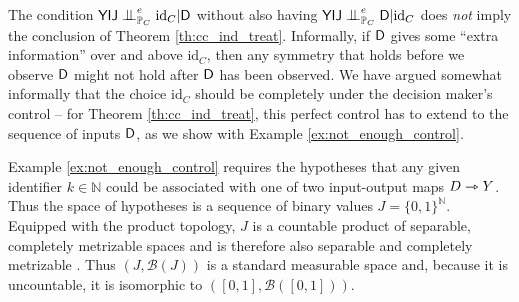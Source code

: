 


The condition $\RV{YIJ}\CI^e_{\prob{P}_C} \text{id}_C|\RV{D}$ without also having $\RV{YIJ}\CI^e_{\prob{P}_C} \RV{D}|\text{id}_C$ does \emph{not} imply the conclusion of Theorem \ref{th:cc_ind_treat}. Informally, if $\mathsf{D}$ gives some ``extra information'' over and above $\text{id}_C$, then any symmetry that holds before we observe $\mathsf{D}$ might not hold after $\mathsf{D}$ has been observed. We have argued somewhat informally that the choice $\text{id}_C$ should be completely under the decision maker's control -- for Theorem \ref{th:cc_ind_treat}, this perfect control has to extend to the sequence of inputs $\mathsf{D}$, as we show with Example \ref{ex:not_enough_control}.

Example \ref{ex:not_enough_control} requires the hypotheses that any given identifier $k\in\mathbb{N}$ could be associated with one of two input-output maps $D\rightarrowtriangle Y$. Thus the space of hypotheses is a sequence of binary values $J=\{0,1\}^{\mathbb{N}}$. Equipped with the product topology, $J$ is a countable product of separable, completely metrizable spaces and is therefore also separable and completely metrizable \citep[Thm. 16.4,Thm. 24.11]{willard_general_1970}. Thus $(J,\mathcal{B}(J))$ is a standard measurable space and, because it is uncountable, it is isomorphic to $([0,1],\mathcal{B}([0,1]))$.

